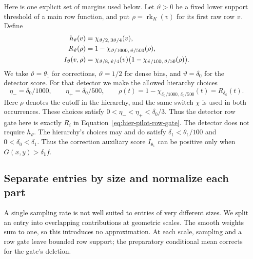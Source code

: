 Here is one explicit set of margins used below.  Let $\vartheta>0$ be a
fixed lower support threshold of a main row function, and put
$\rho=\operatorname{rk}_K(v)$ for its first raw row $v$.  Define
\begin{align}
 h_{\vartheta}(v)
   &=\chi_{\vartheta/2,\,3\vartheta/4}(v),\notag\\
 R_{\vartheta}(\rho)
   &=1-\chi_{\vartheta/1000,\,\vartheta/500}(\rho),\notag\\
 I_{\vartheta}(v,\rho)
   &=\chi_{\vartheta/8,\,\vartheta/4}(v)
       \bigl(1-\chi_{\vartheta/100,\,\vartheta/50}(\rho)\bigr).
 \label{eq:atom-threshold-template}
\end{align}
We take $\vartheta=\theta_1$ for corrections, $\vartheta=1/2$ for dense
bins, and $\vartheta=\delta_0$ for the detector score.  For that detector
we make the allowed hierarchy choices
\[
 \eta_-=\delta_0/1000,\qquad \eta_+=\delta_0/500,\qquad
 \rho(t)=1-\chi_{\delta_0/1000,\,\delta_0/500}(t)
          =R_{\delta_0}(t).
\]
Here $\rho$ denotes the cutoff in the hierarchy, and the same switch
$\chi$ is used in both occurrences.  These choices satisfy
$0<\eta_-<\eta_+<\delta_0/3$.  Thus the detector row gate here is exactly
$R_i$ in Equation~\eqref{eq:hier-pilot-row-gate}.
The detector does not require $h_{\vartheta}$.
The hierarchy's choices may and do satisfy
$\delta_1<\theta_1/100$ and $0<\delta_0<\delta_1$.
Thus the correction auxiliary score $I_{\theta_1}$ can be positive only
when $G(x,y)>\delta_1 f$.

\subsection{Separate entries by size and normalize each part}

A single sampling rate is not well suited to entries of very different sizes. We split an entry into overlapping contributions at geometric scales. The smooth weights sum to one, so this introduces no approximation. At each scale, sampling and a row gate leave bounded row support; the preparatory conditional mean corrects for the gate's deletion.

